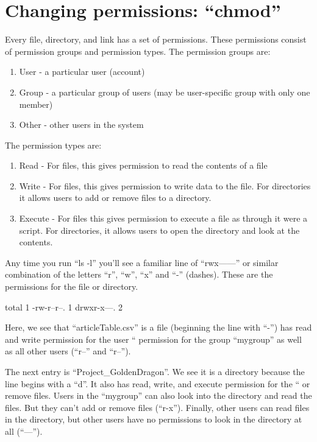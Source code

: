 \section{Changing permissions: ``chmod''}

Every file, directory, and link has a set of permissions. These permissions
consist of permission groups and permission types. The permission groups are:

\begin{enumerate}
\item User - a particular user (account)
\item Group - a particular group of users (may be user-specific group with only one member)
\item Other - other users in the system
\end{enumerate}

The permission types are:

\begin{enumerate}
\item Read - For files, this gives permission to read the contents of a file
\item Write - For files, this gives permission to write data to the file. For directories it allows users to add or remove files to a directory.
\item Execute - For files this gives permission to execute a file as through it were a script. For directories, it allows users to open the directory and look at the contents.
\end{enumerate}

Any time you run ``ls -l'' you'll see a familiar line of ``rwx------'' or similar combination of the letters ``r'', ``w'', ``x'' and ``-'' (dashes). These are the permissions for the file or directory.

\begin{prompt}
total 1
-rw-r--r--. 1 %
drwxr-x---. 2 %
\end{prompt}

Here, we see that ``articleTable.csv'' is a file (beginning the line with ``-'')
has read and write permission for the user ``%
permission for the group ``mygroup'' as well as all other users (``r--'' and
``r--'').

The next entry is ``Project\_GoldenDragon''. We see it is a directory because the
line begins with a ``d''. It also has read, write, and execute permission for
the ``%
or remove files. Users in the ``mygroup'' can also look into the directory and
read the files. But they can't add or remove files (``r-x''). Finally, other
users can read files in the directory, but other users have no permissions to
look in the directory at all (``---'').

